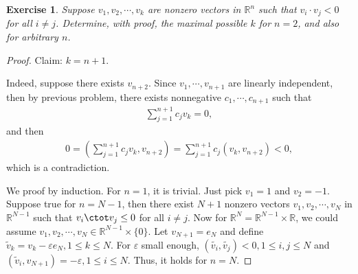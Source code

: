 \documentclass[11pt]{book}
\newtheorem{exercise}{Exercise}[section]
\theoremstyle{definition}
\numberwithin{equation}{chapter}
\begin{document}
\medskip

\begin{exercise}{\bf *}
Suppose $v_1, v_2, \cdots, v_k$ are nonzero vectors in $\mathbb{R}^n$ such that $v_i \cdot v_j < 0$ for all $i \neq j$. Determine, with proof, the maximal possible $k$ for $n = 2$, and also for arbitrary $n$.
\end{exercise}
\begin{proof}
Claim: $k = n + 1$. 

Indeed, suppose there exists $v_{n+2}$. Since $v_1, \cdots, v_{n+1}$ are linearly independent, then by previous problem, there exists nonnegative $c_1, \cdots, c_{n+1}$ such that
\begin{align*}
    \sum^{n+1}_{j=1} c_j v_k = 0,
\end{align*}
and then
\begin{align*}
    0 = \left(\sum^{n+1}_{j=1} c_j v_k, v_{n+2}\right) = \sum^{n+1}_{j=1} c_j \left(v_k, v_{n+2} \right) < 0,
\end{align*}
which is a contradiction. 

We proof by induction. For $n = 1$, it is trivial. Just pick $v_1 = 1$ and $v_2 = -1$. Suppose true for $n = N - 1$, then there exist $N+1$ nonzero vectors $v_1, v_2, \cdots, v_{N}$ in $\mathbb{R}^{N-1}$ such that $v_i \ctot v_j \leq 0$ for all $i \neq j$. Now for $\mathbb{R}^N = \mathbb{R}^{N-1} \times \mathbb{R}$, we could assume $v_1, v_2, \cdots, v_{N} \in \mathbb{R}^{N-1} \times \{0\}$. Let $v_{N+1} = e_N$ and define $\widetilde{v}_k = v_k - \varepsilon e_N, 1 \leq k \leq N$. For $\varepsilon$ small enough, $\left(\tilde{v_i}, \tilde{v_j}\right) < 0, 1 \leq i,j \leq N$ and $\left(\tilde{v}_i, v_{N+1} \right) = - \varepsilon, 1 \leq i \leq N$. Thus, it holds for $n = N$.
\end{proof}

\medskip
\end{document}
